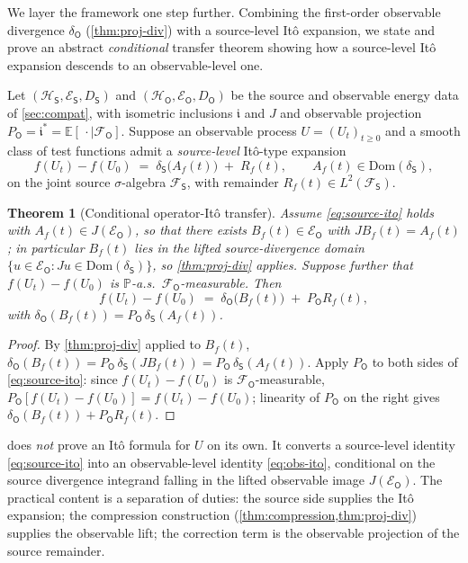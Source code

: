 \documentclass[11pt,reqno]{amsart}
\theoremstyle{plain}
\newtheorem{theorem}{Theorem}[section]
\theoremstyle{definition}
\theoremstyle{remark}
\newcommand{\E}{\mathbb{E}}
\newcommand{\Prob}{\mathbb{P}}
\newcommand{\Hilb}{\mathcal{H}}
\newcommand{\Dom}{\mathrm{Dom}}
\newcommand{\Energy}{\mathcal{E}}
\newcommand{\Source}{\mathsf{S}}
\newcommand{\Obs}{\mathsf{O}}
\renewcommand{\iota}{\mathfrak{i}}
\begin{document}
We layer the framework one step further. Combining the first-order
observable divergence $\delta_\Obs$ (\cref{thm:proj-div}) with a
source-level It\^o expansion, we state and prove an abstract
\emph{conditional} transfer theorem showing how a source-level It\^o
expansion descends to an observable-level one.

Let $(\Hilb_\Source,\Energy_\Source,D_\Source)$ and
$(\Hilb_\Obs,\Energy_\Obs,D_\Obs)$ be the source and observable energy
data of \cref{sec:compat}, with isometric inclusions $\iota$ and $J$
and observable projection
$P_\Obs=\iota^*=\E[\,\cdot\mid\mathcal F_\Obs]$.
Suppose an observable process $U=(U_t)_{t\ge 0}$ and a smooth class of
test functions admit a \emph{source-level} It\^o-type expansion
\begin{equation}\label{eq:source-ito}
  f(U_t)-f(U_0)\;=\;\delta_\Source\bigl(A_f(t)\bigr)\;+\;R_f(t),
  \qquad A_f(t)\in\Dom(\delta_\Source),
\end{equation}
on the joint source $\sigma$-algebra $\mathcal F_\Source$, with
remainder $R_f(t)\in L^{2}(\mathcal F_\Source)$.

\begin{theorem}[Conditional operator-It\^o transfer]\label{thm:transfer}
Assume \eqref{eq:source-ito} holds with $A_f(t)\in J(\Energy_\Obs)$,
so that there exists $B_f(t)\in\Energy_\Obs$ with $JB_f(t)=A_f(t)$; in
particular $B_f(t)$ lies in the lifted source-divergence domain
$\{u\in\Energy_\Obs:Ju\in\Dom(\delta_\Source)\}$, so
\cref{thm:proj-div} applies. Suppose further that $f(U_t)-f(U_0)$ is
$\Prob$-a.s.\ $\mathcal F_\Obs$-measurable. Then
\begin{equation}\label{eq:obs-ito}
  f(U_t)-f(U_0)\;=\;\delta_\Obs\bigl(B_f(t)\bigr)\;+\;P_\Obs R_f(t),
\end{equation}
with $\delta_\Obs(B_f(t))=P_\Obs\,\delta_\Source(A_f(t))$.
\end{theorem}

\begin{proof}
By \cref{thm:proj-div} applied to $B_f(t)$,
$\delta_\Obs(B_f(t))=P_\Obs\,\delta_\Source(JB_f(t))
=P_\Obs\,\delta_\Source(A_f(t))$. Apply $P_\Obs$ to both sides of
\eqref{eq:source-ito}: since $f(U_t)-f(U_0)$ is
$\mathcal F_\Obs$-measurable, $P_\Obs[f(U_t)-f(U_0)]=f(U_t)-f(U_0)$;
linearity of $P_\Obs$ on the right gives
$\delta_\Obs(B_f(t))+P_\Obs R_f(t)$.
\end{proof}

 does \emph{not} prove an It\^o formula for $U$ on
its own. It converts a source-level identity \eqref{eq:source-ito}
into an observable-level identity \eqref{eq:obs-ito}, conditional on
the source divergence integrand falling in the lifted observable image
$J(\Energy_\Obs)$. The practical content is a separation of duties:
the source side supplies the It\^o expansion; the compression
construction (\cref{thm:compression,thm:proj-div}) supplies the
observable lift; the correction term is the observable projection of
the source remainder.
\end{document}
